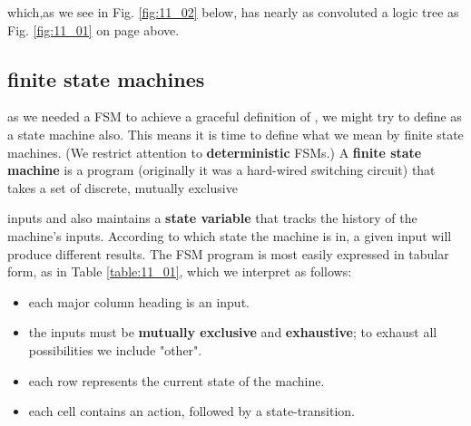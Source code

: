 which,as we see in Fig. \ref{fig:11_02} below, has nearly as convoluted a logic tree as Fig. \ref{fig:11_01} on page \pageref{fig:11_01} above.

\subsection{finite state machines}\label{chap:11_02_02}

 as we needed a FSM to achieve a graceful definition of , we might try to define  as a state machine also. This means it is time to define what we mean by finite state machines. (We restrict attention to \textbf{deterministic} FSMs.) A \textbf{finite state machine} is a program (originally it was a hard-wired switching circuit) that takes a set of discrete, mutually exclusive



inputs and also maintains a \textbf{state variable} that tracks the history of the machine's inputs. According to which state the machine is in, a given input will produce different results. The FSM program is most easily expressed in tabular form, as in Table \ref{table:11_01}, which we interpret as follows:

\begin{itemize}
    \item each major column heading is an input.
    \item the inputs must be \textbf{mutually exclusive} and \textbf{exhaustive}; to exhaust all possibilities we include "other".
    \item each row represents the current state of the machine.
    \item each cell contains an action, followed by a state-transition.
\end{itemize}


